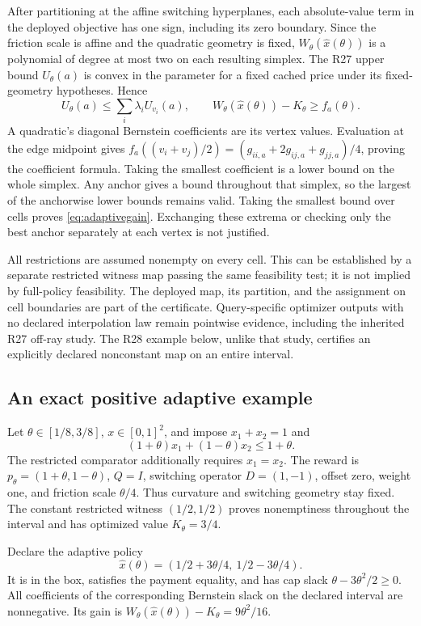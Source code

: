 After partitioning at the affine switching hyperplanes, each absolute-value term in the deployed objective has one sign, including its zero boundary. Since the friction scale is affine and the quadratic geometry is fixed, $W_\theta(\widehat x(\theta))$ is a polynomial of degree at most two on each resulting simplex. The R27 upper bound $U_\theta(a)$ is convex in the parameter for a fixed cached price under its fixed-geometry hypotheses. Hence
\[
 U_\theta(a)\leq\sum_i\lambda_i U_{v_i}(a),\qquad
 W_\theta(\widehat x(\theta))-K_\theta\geq f_a(\theta).
\]
A quadratic's diagonal Bernstein coefficients are its vertex values. Evaluation at the edge midpoint gives
$f_a((v_i+v_j)/2)=(g_{ii,a}+2g_{ij,a}+g_{jj,a})/4$, proving the coefficient formula. Taking the smallest coefficient is a lower bound on the whole simplex. Any anchor gives a bound throughout that simplex, so the largest of the anchorwise lower bounds remains valid. Taking the smallest bound over cells proves \eqref{eq:adaptivegain}. Exchanging these extrema or checking only the best anchor separately at each vertex is not justified.

All restrictions are assumed nonempty on every cell. This can be established by a separate restricted witness map passing the same feasibility test; it is not implied by full-policy feasibility. The deployed map, its partition, and the assignment on cell boundaries are part of the certificate. Query-specific optimizer outputs with no declared interpolation law remain pointwise evidence, including the inherited R27 off-ray study. The R28 example below, unlike that study, certifies an explicitly declared nonconstant map on an entire interval.

\subsection{An exact positive adaptive example}
Let $\theta\in[1/8,3/8]$, $x\in[0,1]^2$, and impose $x_1+x_2=1$ and
\[
 (1+\theta)x_1+(1-\theta)x_2\leq1+\theta.
\]
The restricted comparator additionally requires $x_1=x_2$. The reward is $p_\theta=(1+\theta,1-\theta)$, $Q=I$, switching operator $D=(1,-1)$, offset zero, weight one, and friction scale $\theta/4$. Thus curvature and switching geometry stay fixed. The constant restricted witness $(1/2,1/2)$ proves nonemptiness throughout the interval and has optimized value $K_\theta=3/4$.

Declare the adaptive policy
\[
 \widehat x(\theta)=(1/2+3\theta/4,\ 1/2-3\theta/4).
\]
It is in the box, satisfies the payment equality, and has cap slack $\theta-3\theta^2/2\geq0$. All coefficients of the corresponding Bernstein slack on the declared interval are nonnegative. Its gain is $W_\theta(\widehat x(\theta))-K_\theta=9\theta^2/16$.

